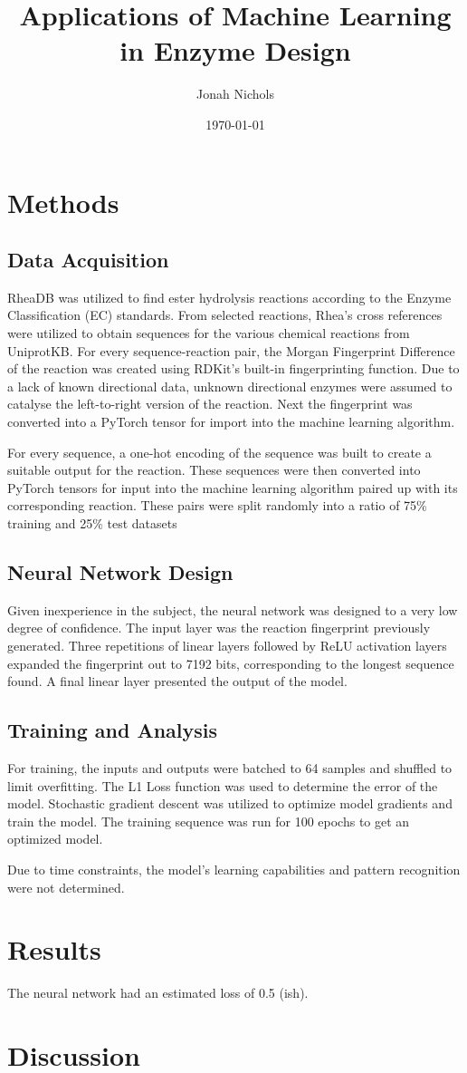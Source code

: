 \documentclass[12pt]{article}
\title{Applications of Machine Learning in Enzyme Design}
\author{Jonah Nichols}
\date{\today}
\begin{document}
\maketitle
\section{Methods}
\subsection{Data Acquisition}
RheaDB was utilized to find ester hydrolysis reactions according to the Enzyme Classification
(EC) standards. From selected reactions, Rhea's cross references were utilized
to obtain sequences for the various chemical reactions from UniprotKB. For every
sequence-reaction pair, the Morgan Fingerprint Difference of the reaction was created using
RDKit's built-in fingerprinting function. Due to a lack of known directional data,
unknown directional enzymes were assumed to catalyse the left-to-right version of
the reaction. Next the fingerprint was converted into a PyTorch tensor for import
into the machine learning algorithm.

For every sequence, a one-hot encoding of the sequence was built to create a suitable
output for the reaction. These sequences were then converted into PyTorch tensors
for input into the machine learning algorithm paired up with its corresponding reaction.
These pairs were split randomly into a ratio of 75\% training and 25\% test datasets

\subsection{Neural Network Design}
Given inexperience in the subject, the neural network was designed to a very low
degree of confidence. The input layer was the reaction fingerprint previously generated.
Three repetitions of linear layers followed by ReLU activation layers expanded the
fingerprint out to 7192 bits, corresponding to the longest sequence found. A final
linear layer presented the output of the model.

\subsection{Training and Analysis}
For training, the inputs and outputs were batched to 64 samples and shuffled to
limit overfitting. The L1 Loss function was used to determine the error of the
model. Stochastic gradient descent was utilized to optimize model gradients and
train the model. The training sequence was run for 100 epochs to get an optimized
model.

Due to time constraints, the model's learning capabilities and pattern recognition
were not determined.

\section{Results}
The neural network had an estimated loss of 0.5 (ish).

\section{Discussion}
\end{document}
